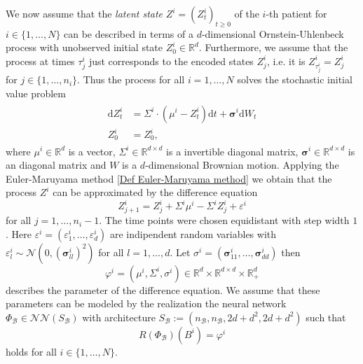 \documentclass[11pt,titlepage]{article}
\newcommand{\R}{\mathbb{R}} %
\theoremstyle{definition}
\theoremstyle{remark}
\begin{document}
	We now assume that the \textsl{latent state} $Z^i=(Z^i_t)_{t\geq 0}$ of the $i$-th patient for  $i\in\{1,\ldots, N\}$ can be described in terms of a $d$-dimensional Ornstein-Uhlenbeck process with unobserved initial state $Z^i_0\in \R^d$. Furthermore, we assume that the process at times 
	$\tau^i_j$ just corresponds to the encoded states $Z^i_j$, i.e. it is 
	$Z^i_{\tau^i_j}=Z^i_j$ for $j\in\{1,\ldots,n_i\}$. Thus the process for all $i=1,\ldots,N$ solves the  stochastic initial value problem
	\begin{align}
		\begin{split} 
			\mathrm{d}Z_t^i &= \Sigma^i \cdot (\mu^i- Z_t^i)\mathrm{d}t +\boldsymbol{\sigma}^i \mathrm{d}W_t\\
			Z^i_0 &= Z^i_0, \label{SDE OUP}
		\end{split} 
	\end{align}
	where $\mu^i\in\R^d$ is a vector, $\Sigma^i\in\R^{d\times d}$ is a invertible diagonal matrix, $\boldsymbol{\sigma}^i\in\R^{d\times d}$ is an diagonal matrix and $W$ is a $d$-dimensional Brownian motion. Applying the Euler-Maruyama method \ref{Def Euler-Maruyama method} 
	we obtain that 
	the process $Z^i$ can be approximated by the difference equation
	\[Z^i_{j+1} = Z_j^i + \Sigma^i \mu^i - \Sigma^i Z_j^i + \varepsilon^i\]
	for all $j=1,\ldots, n_i -1$. The time points were chosen equidistant with step width $1$. 
	Here $\varepsilon^i=(\varepsilon^i_1,\ldots,\varepsilon^i_d)$ are 
	indipendent random variables with 
	$\varepsilon^i_l \sim\mathcal{N}(0,(\boldsymbol{\sigma}^i_{ll})^2)$ for all $l=1,\ldots,d$. 
	Let $\sigma^i =(\boldsymbol{\sigma}^i_{11},\ldots,\boldsymbol{\sigma}^i_{dd})$ then
	\[\varphi^i=(\mu^i,\Sigma^i,\sigma^i)\in\R^d\times \R^{d\times d}\times \R_+^d\]
	describes the parameter of the difference equation. We assume that these parameters can be modeled by the realization the  
	neural network $\Phi_\mathcal{B}\in\mathcal{N}\mathcal{N}(S_\mathcal{B})$ with architecture $S_\mathcal{B} := (n_\mathcal{B}, n_\mathcal{B}, 2d + d^2, 2d + d^2)$ such that
	\[R(\Phi_\mathcal{B})(B^i)=\varphi^i\]
	holds for all $i\in\{1,\ldots,N\}$.\\
	
\end{document}
